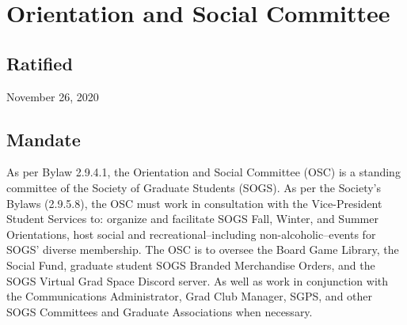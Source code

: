 \section{Orientation and Social Committee}
\subsection{Ratified}
November 26, 2020
\subsection{Mandate}
As per Bylaw 2.9.4.1, the Orientation and Social Committee (OSC) is a standing committee of the Society of Graduate Students (SOGS). As per the Society's Bylaws (2.9.5.8), the OSC must work in consultation with the Vice-President Student Services to: organize and facilitate SOGS Fall, Winter, and Summer Orientations, host social and recreational--including non-alcoholic--events for SOGS' diverse membership. The OSC is to oversee the Board Game Library, the Social Fund, graduate student SOGS Branded Merchandise Orders, and the SOGS Virtual Grad Space Discord server. As well as work in conjunction with the Communications Administrator, Grad Club Manager, SGPS, and other SOGS Committees and Graduate Associations when necessary.

